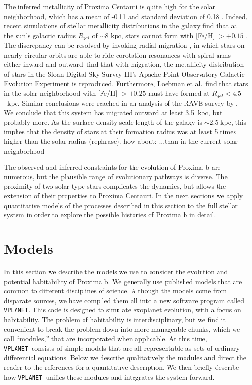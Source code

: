 \documentclass[preprint,12pt]{aastex}
\newcommand{\xxx}[1]{{\color{red} #1}} %
\def\vplanet{\texttt{\footnotesize{VPLANET}}\xspace}
\begin{document}
The \xxx{inferred} metallicity of Proxima Centauri is quite high for the solar
neighborhood, which has a mean of -0.11 and standard deviation of 0.18
\citep{AllendePrieto04}. Indeed, recent simulations of stellar
metallicity distributions in the galaxy find that at the sun's
galactic radius $R_{gal}$ of $\sim$8 kpc, stars cannot form with
[Fe/H] $> +0.15$ \citep{Loebman16}. The discrepancy can be resolved by
invoking radial migration \citep{SellwoodBinney02}, in which stars on
nearly circular orbits are able to ride corotation resonances with
spiral arms either inward and outward. \cite{Loebman16} find that with
migration, the metallicity distribution of stars in the Sloan Digital
Sky Survey III's Apache Point Observatory Galactic Evolution
Experiment \citep{Hayden15} is reproduced. Furthermore, Loebman et
al.\ find that stars in the solar neighborhood with [Fe/H] $> +0.25$
must have formed at $R_{gal} < 4.5$~kpc.
\xxx{Similar conclusions were reached in an analysis of the RAVE
  survey by \citep{Kordopatis15}.}
We conclude that this system
has migrated outward at least 3.5~kpc, but probably more. As the surface
density scale length of the galaxy is $\sim$2.5 kpc, this implies that
the density of stars at their formation radius was at least 5 times
higher than \xxx{the solar radius (rephrase)}. \xxx{how about: ...than 
in the current solar neighborhood}

The observed and inferred constraints for the evolution of Proxima b
are numerous, but the plausible range of evolutionary pathways is
diverse. The proximity of two solar-type stars complicates the
dynamics, but allows the extension of their properties to Proxima
Centauri. In the next sections we apply quantitative models of the
processes described in this section to the full stellar system in order to
explore the possible histories of Proxima b in detail.


\section{Models\label{sec:models}}

In this section we describe the models we use to consider the
evolution and potential habitability of Proxima b. We generally use
published models that are common to different disciplines of
science. Although the models come from disparate sources, we have
compiled them all into a new software program called \vplanet. This
code is designed to simulate exoplanet evolution, with a focus on
habitability. The problem of habitability is interdisciplinary, but we
find it convenient to break the problem down into more manageable
chunks, which we call ``modules,'' that are incorporated when
applicable. At this time, \vplanet~consists of simple models that are
all representable as sets of ordinary differential equations. Below we
describe qualitatively the modules and direct the reader to the
references for a quantitative description. We then briefly describe
how \vplanet~unifies these modules and integrates the system forward.
\end{document}
